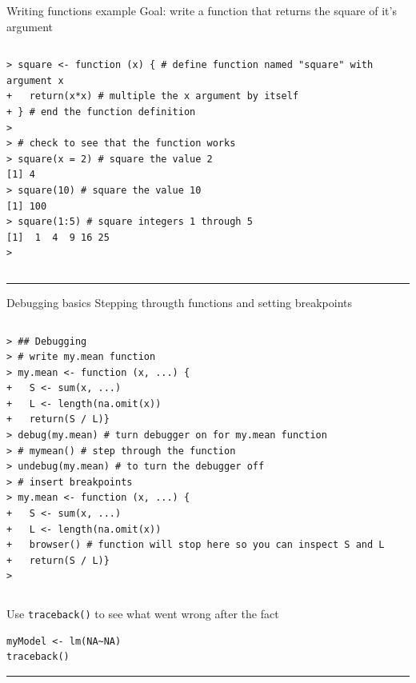 \documentclass[table,smaller]{beamer}
\begin{document}
\begin{frame}[fragile,label=sec-5-3]{Writing functions example}
 Goal: write a function that returns the square of it's argument

\vspace{-.5em}
\begin{columns}
\begin{block}{}
\begin{verbatim}
> square <- function (x) { # define function named "square" with argument x
+   return(x*x) # multiple the x argument by itself
+ } # end the function definition
> 
> # check to see that the function works
> square(x = 2) # square the value 2
[1] 4
> square(10) # square the value 10
[1] 100
> square(1:5) # square integers 1 through 5
[1]  1  4  9 16 25
>
\end{verbatim}
\end{block}
\end{columns}
\vspace{.5em}

\rule{\linewidth}{0.5pt}
\end{frame}
\begin{frame}[fragile,label=sec-5-4]{Debugging basics}
 Stepping througth functions and setting breakpoints

\vspace{-.5em}
\begin{columns}
\begin{block}{}
\begin{verbatim}
> ## Debugging
> # write my.mean function
> my.mean <- function (x, ...) {
+   S <- sum(x, ...)
+   L <- length(na.omit(x))
+   return(S / L)}
> debug(my.mean) # turn debugger on for my.mean function
> # mymean() # step through the function
> undebug(my.mean) # to turn the debugger off
> # insert breakpoints
> my.mean <- function (x, ...) {
+   S <- sum(x, ...)
+   L <- length(na.omit(x))
+   browser() # function will stop here so you can inspect S and L
+   return(S / L)}
>
\end{verbatim}
\end{block}
\end{columns}
\vspace{.5em}

Use \texttt{traceback()} to see what went wrong after the fact

\begin{verbatim}
myModel <- lm(NA~NA)
traceback()
\end{verbatim}

\rule{\linewidth}{0.5pt}
\end{frame}
\end{document}

